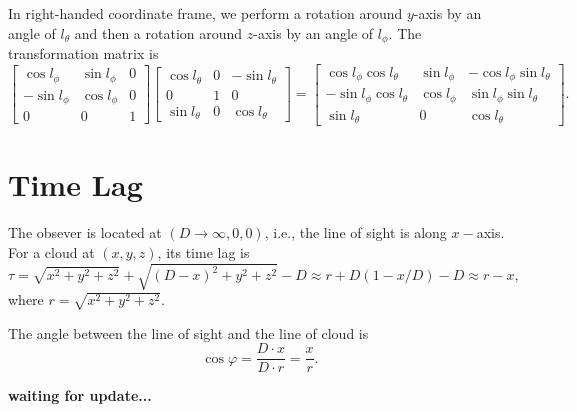 \documentclass[oneside]{book}
\begin{document}
In right-handed coordinate frame, we perform a rotation around $y$-axis by an angle of $l_\theta$ and 
then a rotation around $z$-axis by an angle of $l_\phi$. The transformation matrix is
\begin{equation}
\left[\begin{array}{ccc}
\cos l_\phi & \sin l_\phi & 0 \\
-\sin l_\phi &  \cos l_\phi & 0 \\
     0      &      0       & 1 
\end{array}\right]
\left[\begin{array}{ccc}
\cos l_\theta  & 0  & -\sin l_\theta\\
   0      &      1        &  0  \\
\sin l_\theta &  0  & \cos l_\theta 
\end{array}\right]=
\left[\begin{array}{ccc}
\cos l_\phi\cos l_\theta  & \sin l_\phi  & -\cos l_\phi\sin l_\theta\\
-\sin l_\phi\cos l_\theta      & \cos l_\phi        &  \sin l_\phi\sin l_\theta  \\
\sin l_\theta &  0  & \cos l_\theta 
\end{array}\right]
.
\end{equation}

\section{Time Lag}
The obsever is located at $(D\rightarrow\infty, 0, 0)$, i.e., the line of sight is along $x-$axis. 
For a cloud at $(x, y, z)$, its time lag is
\begin{equation}
\tau =\sqrt{x^2+y^2+z^2} + \sqrt{(D-x)^2+y^2+z^2} - D \approx r + D(1-x/D) - D \approx r - x,
\end{equation}
where $r=\sqrt{x^2+y^2+z^2}$.

The angle between the line of sight and the line of cloud is
\begin{equation}
 \cos \varphi = \frac{D\cdot x}{D\cdot r} = \frac{x}{r}.
\end{equation}

{\bf waiting for update...}
\end{document}
